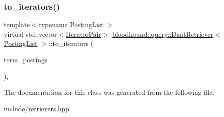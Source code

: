 \subsubsection{\texorpdfstring{to\+\_\+iterators()}{to\_iterators()}}
{\footnotesize\ttfamily template$<$typename Posting\+List $>$ \\
virtual std\+::vector$<$\mbox{\hyperlink{structbloodhound_1_1query_1_1DaatRetriever_1_1IteratorPair}{Iterator\+Pair}}$>$ \mbox{\hyperlink{classbloodhound_1_1query_1_1DaatRetriever}{bloodhound\+::query\+::\+Daat\+Retriever}}$<$ \mbox{\hyperlink{classbloodhound_1_1PostingList}{Posting\+List}} $>$\+::to\+\_\+iterators (\begin{DoxyParamCaption}\item[{const std\+::vector$<$ \mbox{\hyperlink{classbloodhound_1_1PostingList}{Posting\+List}} $>$ \&}]{term\+\_\+postings }\end{DoxyParamCaption})\hspace{0.3cm}{\ttfamily [inline]}, {\ttfamily [virtual]}}



The documentation for this class was generated from the following file\+:\begin{DoxyCompactItemize}
\item 
include/\mbox{\hyperlink{retrievers_8hpp}{retrievers.\+hpp}}\end{DoxyCompactItemize}
